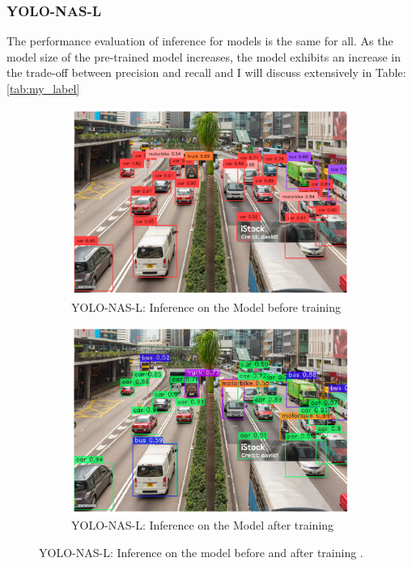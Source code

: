 \subsubsection{YOLO-NAS-L}
The performance evaluation of inference for models is the same for all.
As the model size of the pre-trained model increases, the model exhibits an increase in the trade-off between precision and recall and I will discuss extensively in Table: \ref{tab:my_label} 
\begin{figure}[H]
  \centering
  \begin{subfigure}{\textwidth}
    \centering
    \includegraphics[width=\textwidth]{tex/img/YNL2__BT_6.png}
    \caption{YOLO-NAS-L: Inference on the Model before training}
    \label{fig:sub_M1}
  \end{subfigure}
  \hfill
  \begin{subfigure}{\textwidth}
    \centering
    \includegraphics[width=\textwidth]{tex/img/YNL2__AT_6.png}
    \caption{YOLO-NAS-L: Inference on the Model after training}
    \label{fig:sub_M2}
  \end{subfigure}
  \caption{YOLO-NAS-L: Inference on the model before and  after training .}
  \label{fig:NAS-L} 
\end{figure}


